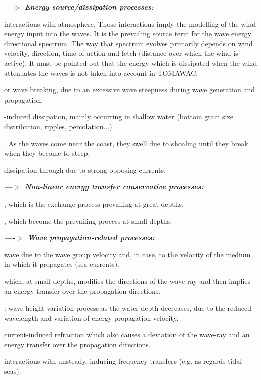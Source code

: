  \textbf{\textit{---$>$ Energy source/dissipation processes:}}

  interactions with atmosphere. Those interactions imply the modelling of the wind energy input into the waves. It is the prevailing source term for the wave energy directional spectrum. The way that spectrum evolves primarily depends on wind velocity, direction, time of action and fetch (distance over which the wind is active). It must be pointed out that the energy which is dissipated when the wind attenuates the waves is not taken into account in TOMAWAC.

  or wave breaking, due to an excessive wave steepness during wave generation and propagation.

 -induced dissipation, mainly occurring in shallow water (bottom grain size distribution, ripples, percolation...)

 . As the waves come near the coast, they swell due to shoaling until they break when they become to steep.

 dissipation through  due to strong opposing currents.

 \textbf{\textit{---$>$ Non-linear energy transfer conservative processes:}}

 , which is the exchange process prevailing at great depths.

 , which become the prevailing process at small depths.

 \textbf{\textit{----$>$ Wave propagation-related processes:}}

  wave  due to the wave group velocity and, in case, to the velocity of the medium in which it propagates (sea currents).

  which, at small depths, modifies the directions of the wave-ray and then implies an energy transfer over the propagation directions.

 : wave height variation process as the water depth decreases, due to the reduced wavelength and variation of energy propagation velocity.

 current-induced refraction which also causes a deviation of the wave-ray and an energy transfer over the propagation directions.

 interactions with unsteady, inducing frequency transfers (e.g. as regards tidal seas).

